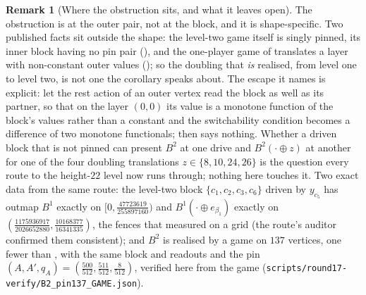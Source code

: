 \documentclass[11pt]{article}
\theoremstyle{plain}
\theoremstyle{definition}
\newtheorem{remark}[theorem]{Remark}
\begin{document}
\begin{remark}[Where the obstruction sits, and what it leaves open]\label{rem:pinned-escape}
The obstruction is at the outer pair, not at the block, and it is
shape-specific. Two published facts sit outside the shape: the level-two
game itself is singly pinned, its inner block having no pin pair
(), and the one-player game of 
translates a layer with non-constant outer values ();
so the doubling that \emph{is} realised, from level one to level two, is
not one the corollary speaks about. The escape it names is explicit: let
the rest action of an outer vertex read the block as well as its partner,
so that on the layer $(0,0)$ its value is a monotone function of the
block's values rather than a constant and the switchability condition
becomes a difference of two monotone functionals; 
then says nothing. Whether a driven block that is not pinned can present
$B^{2}$ at one drive and $B^{2}(\cdot\oplus z)$ at another for one of the
four doubling translations $z\in\{8,10,24,26\}$ is the question every
route to the height-$22$ level now runs through; nothing here touches it.
Two exact data from the same route: the level-two block
$\{c_1,c_2,c_3,c_6\}$ driven by $y_{c_5}$ has outmap $B^{1}$ exactly on
$[0,\tfrac{47723619}{255897160})$ and $B^{1}(\cdot\oplus e_{\beta_1})$
exactly on $(\tfrac{1175936917}{2026652880},\tfrac{10168377}{16341335})$,
the fences that  measured on a grid (the route's
auditor confirmed them consistent); and $B^{2}$ is realised by a game on
$137$ vertices, one fewer than , with the same
block and readouts and the pin $(A,A',q_A)=(\tfrac{500}{512},\tfrac{511}{512},\tfrac8{512})$,
verified here from the game (\texttt{scripts/round17-verify/B2\_pin137\_GAME.json}).
\end{remark}
\end{document}
